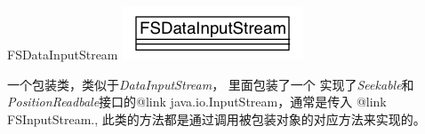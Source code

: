 \begin{XeClass}{FSDataInputStream}
\includegraphics[width=\textwidth]{cdig/FSDataInputStream.png}
     
 一个包装类，类似于\emph{DataInputStream}， 里面包装了一个
 实现了\emph{Seekable}和\emph{PositionReadbale}接口的{@link java.io.InputStream}，通常是传入 {@link FSInputStream.},
 此类的方法都是通过调用被包装对象的对应方法来实现的。

\end{XeClass}
